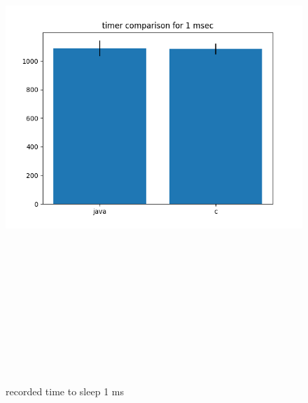 \documentclass{article}
\begin{document}
    \begin{figure}[H]
    	\centering
    	\includegraphics[width=17cm,height=20cm,keepaspectratio]{AsyncMonitorCompares/sleep-timer_java-vs-c/time-compare-1.png}
    	\caption{recorded time to sleep 1 ms}
    	\label{fig:xalan-fix-PKG}
    \end{figure}
\end{document}
